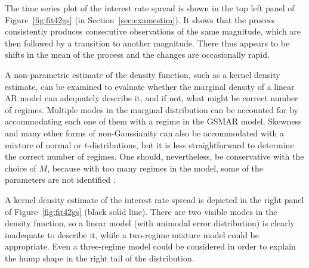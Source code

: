 \documentclass[nojss]{jss} %
\begin{document}
The time series plot of the interest rate spread  is shown in the top left panel of Figure~\ref{fig:fit42gs} (in Section~\ref{sec:examestim}). It shows that the process consistently produces consecutive observations of the same magnitude, which are then followed by a transition to another magnitude. There thus appears to be shifts in the mean of the process and the changes are occasionally rapid. %

A non-parametric estimate of the density function, such as a kernel density estimate, can be examined to evaluate whether the marginal density of a linear AR model can adequately describe it, and if not, what might be correct number of regimes. Multiple modes in the marginal distribution can be accounted for by accommodating each one of them with a regime in the GSMAR model. Skewness and many other forms of non-Gaussianity can also be accommodated with a mixture of normal or $t$-distributions, but it is less straightforward to determine the correct number of regimes. One should, nevertheless, be conservative with the choice of $M$, because with too many regimes in the model, some of the parameters are not identified \cite[see][Sections 3.1 and 3.2.2 and the references therein]{Kalliovirta+Meitz+Saikkonen:2015}.

A kernel density estimate of the interest rate spread is depicted in the right panel of Figure~\ref{fig:fit42gs} (black solid line). There are two visible modes in the density function, so a linear model (with unimodal error distribution) is clearly inadequate to describe it, while a two-regime mixture model could be appropriate. Even a three-regime model could be considered in order to explain the hump shape in the right tail of the distribution.
\end{document}
